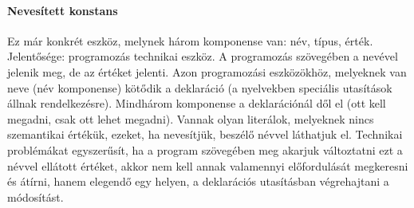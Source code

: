 \paragraph{Nevesített konstans}
Ez már konkrét eszköz, melynek három komponense van: név, típus, érték. Jelentősége: programozás technikai eszköz. A programozás szövegében a nevével jelenik meg, de az értéket jelenti. Azon programozási eszközökhöz, melyeknek van neve (név komponense) kötődik a deklaráció (a nyelvekben speciális utasítások állnak rendelkezésre). Mindhárom komponense a deklarációnál dől el (ott kell megadni, csak ott lehet megadni). Vannak olyan literálok, melyeknek nincs szemantikai értékük, ezeket, ha nevesítjük, beszélő névvel láthatjuk el. Technikai problémákat egyszerűsít, ha a program szövegében meg akarjuk változtatni ezt a névvel ellátott értéket, akkor nem kell annak valamennyi előfordulását megkeresni és átírni, hanem elegendő egy helyen, a deklarációs utasításban végrehajtani a módosítást.

